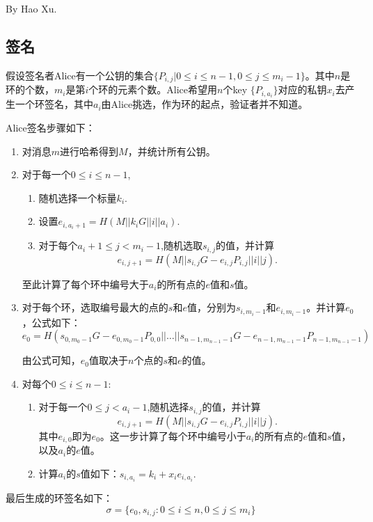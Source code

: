 By Hao Xu.
\subsection{签名}
假设签名者Alice有一个公钥的集合$\{P_{i,j}|0 \leq i \leq n-1 , 0 \leq j \leq m_i-1\}$。其中$n$是环的个数，$m_i$是第\(i\)个环的元素个数。Alice希望用\(n\)个key $\{P_{i,a_i}\}$对应的私钥$x_i$去产生一个环签名，其中$a_i$由Alice挑选，作为环的起点，验证者并不知道。\par
Alice签名步骤如下：
\begin{enumerate}
	\item 对消息\(m\)进行哈希得到\(M\)，并统计所有公钥。
	\item 对于每一个$0 \leq i \leq n-1$,
	\begin{enumerate}
		\item 随机选择一个标量$k_i$.
		\item 设置$e_{i,a_i+1}=H(M||k_iG||i||a_i)$.
		\item 对于每个$a_i+1 \leq j < m_i-1$,随机选取$s_{i,j}$的值，并计算
		\begin{equation*}
		e_{i,j+1}=H(M||s_{i,j}G-e_{i,j}P_{i,j}||i||j).
		\end{equation*}
	\end{enumerate}\par
	至此计算了每个环中编号大于$a_i$的所有点的\(e\)值和\(s\)值。
\item 对于每个环，选取编号最大的点的\(s\)和\(e\)值，分别为$s_{i,m_i-1}$和$e_{i,m_i-1}$。并计算$e_0$，公式如下：
\begin{equation*}
e_0=H(s_{0,m_0-1}G-e_{0,m_0-1}P_{0,0}||\dots||s_{n-1,m_{n-1}-1}G-e_{n-1,m_{n-1}-1}P_{n-1,m_{n-1}-1})
\end{equation*}\par 
由公式可知，$e_0$值取决于\(n\)个点的\(s\)和\(e\)的值。
\item 对每个$0 \leq i \leq n-1$:
\begin{enumerate}
	\item 对于每一个$0 \leq j < a_i-1 $,随机选择$s_{i,j}$的值，并计算
			\begin{equation*}
				e_{i,j+1}=H(M||s_{i,j}G-e_{i,j}P_{i,j}||i||j).
			\end{equation*}
			其中$e_{i,0}$即为$e_0$。这一步计算了每个环中编号小于$a_i$的所有点的\(e\)值和\(s\)值，以及$a_i$的\(e\)值。
		\item 计算$a_i$的\(s\)值如下：$s_{i,a_i}=k_i+x_ie_{i,a_i}$.
\end{enumerate}
\end{enumerate}\par 
最后生成的环签名如下：
\begin{equation*}
\sigma =\{e_0, s_{i,j} :0 \leq i \leq n, 0 \leq j \leq m_i\}
\end{equation*}

